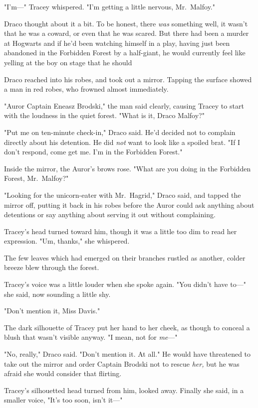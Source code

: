 "I'm\mbox{---}" Tracey whispered. "I'm getting a little nervous, Mr.~Malfoy."

Draco thought about it a bit. To be honest, there \emph{was} something{\el}
well, it wasn't that he was a coward, or even that he was scared. But there had
been a murder at Hogwarts and if he'd been watching himself in a play, having
just been abandoned in the Forbidden Forest by a half-giant, he would currently
feel like yelling at the boy on stage that he should{\el}

Draco reached into his robes, and took out a mirror. Tapping the surface showed
a man in red robes, who frowned almost immediately.

"Auror Captain Eneasz Brodski," the man said clearly, causing Tracey to start
with the loudness in the quiet forest. "What is it, Draco Malfoy?"

"Put me on ten-minute check-in," Draco said. He'd decided not to complain
directly about his detention. He did \emph{not} want to look like a spoiled
brat. "If I don't respond, come get me. I'm in the Forbidden Forest."

Inside the mirror, the Auror's brows rose. "What are you doing in the Forbidden
Forest, Mr.~Malfoy?"

"Looking for the unicorn-eater with Mr.~Hagrid," Draco said, and tapped the
mirror off, putting it back in his robes before the Auror could ask anything
about detentions or say anything about serving it out without complaining.

Tracey's head turned toward him, though it was a little too dim to read her
expression. "Um, thanks," she whispered.

The few leaves which had emerged on their branches rustled as another, colder
breeze blew through the forest.

Tracey's voice was a little louder when she spoke again. "You didn't have
to\mbox{---}" she said, now sounding a little shy.

"Don't mention it, Miss Davis."

The dark silhouette of Tracey put her hand to her cheek, as though to conceal a
blush that wasn't visible anyway. "I mean, not for \emph{me}\mbox{---}"

"No, really," Draco said. "Don't mention it. At all." He would have threatened
to take out the mirror and order Captain Brodski not to rescue \emph{her,} but
he was afraid she would consider that flirting.

Tracey's silhouetted head turned from him, looked away. Finally she said, in a
smaller voice, "It's too soon, isn't it\mbox{---}"

